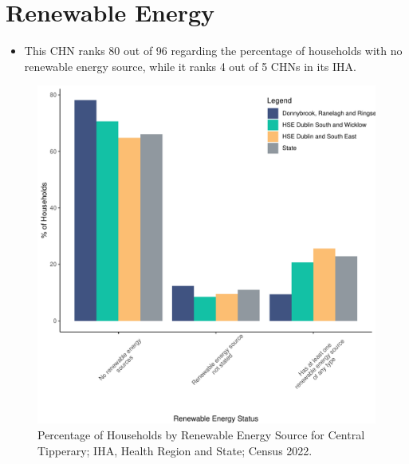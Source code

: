 \documentclass{article}
\begin{document}
\section{Renewable Energy}\label{sect:RE}
\begin{itemize}
\item This CHN ranks  80 out of 96 regarding the percentage of households with no renewable energy source, while it ranks   4 out of 5 CHNs in its IHA.
\end{itemize}
\begin{figure}[H]
	\centering
	\includegraphics[width = 140mm]{../figures/RenewableEnergyED.pdf}
	\caption{Percentage of Households by Renewable Energy Source for Central Tipperary; IHA, Health Region and State; Census 2022.}
	\label{fig:vbnv}
	\end{figure}
\end{document}
